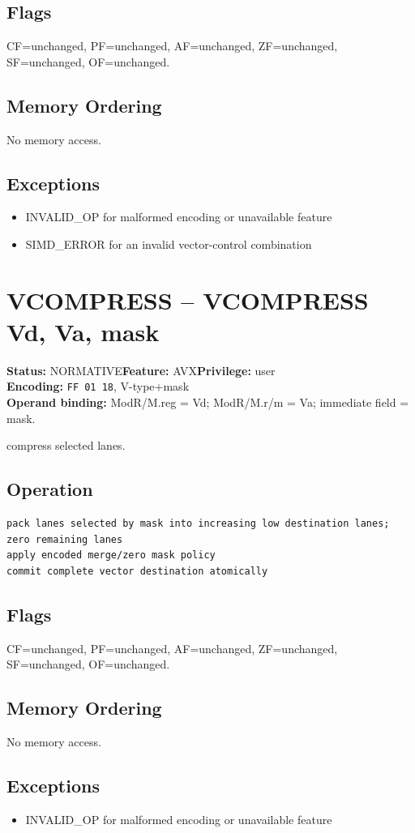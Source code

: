 \documentclass[10pt]{article}
\begin{document}
\subsection*{Flags}
CF=unchanged, PF=unchanged, AF=unchanged, ZF=unchanged, SF=unchanged, OF=unchanged.
\subsection*{Memory Ordering}
No memory access.
\subsection*{Exceptions}
\begin{itemize}
\item INVALID\_OP for malformed encoding or unavailable feature
\item SIMD\_ERROR for an invalid vector-control combination
\end{itemize}
\clearpage

\section{VCOMPRESS -- VCOMPRESS Vd, Va, mask}
\textbf{Status:} NORMATIVE\quad \textbf{Feature:} AVX\quad \textbf{Privilege:} user\\
\textbf{Encoding:} \texttt{FF 01 18}, V-type+mask\\
\textbf{Operand binding:} ModR/M.reg = Vd; ModR/M.r/m = Va; immediate field = mask.

compress selected lanes.

\subsection*{Operation}
\begin{lstlisting}
pack lanes selected by mask into increasing low destination lanes; zero remaining lanes
apply encoded merge/zero mask policy
commit complete vector destination atomically
\end{lstlisting}
\subsection*{Flags}
CF=unchanged, PF=unchanged, AF=unchanged, ZF=unchanged, SF=unchanged, OF=unchanged.
\subsection*{Memory Ordering}
No memory access.
\subsection*{Exceptions}
\begin{itemize}
\item INVALID\_OP for malformed encoding or unavailable feature
\end{itemize}
\clearpage
\end{document}
